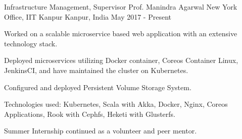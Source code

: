 

\begin{cventries}

  \cventry
    {Infrastructure Management, Supervisor Prof. Manindra Agarwal} %
    {New York Office, IIT Kanpur} %
    {Kanpur, India} %
    {May 2017 - Present} %
    {
      \begin{cvitems} %
        \item {Worked on a scalable microservice based web application with an extensive technology stack.}
        \item {Deployed microservices utilizing Docker container, Coreos Container Linux, JenkinsCI, and have maintained the cluster on Kubernetes.}
        \item {Configured and deployed Persistent Volume Storage System.}
        \item {Technologies used: Kubernetes, Scala with Akka, Docker, Nginx, Coreos Applications, Rook with Cephfs, Heketi with Glusterfs.}
        \item {Summer Internship continued as a volunteer and peer mentor.}
      \end{cvitems}
    }

\end{cventries}
